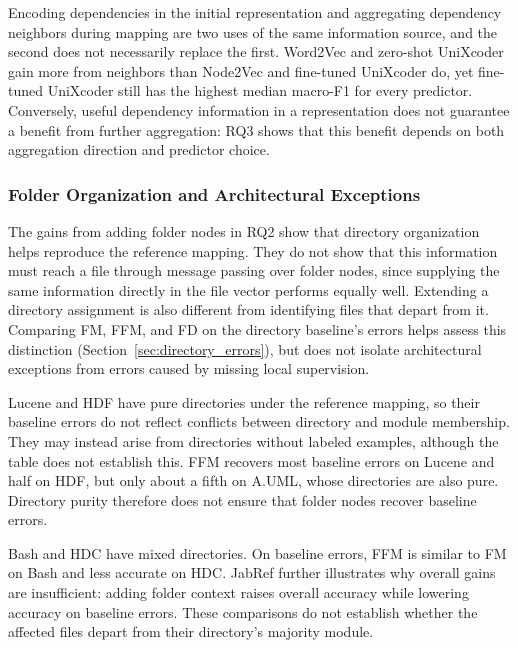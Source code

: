 Encoding dependencies in the initial representation and aggregating dependency neighbors during mapping are two uses of the same information source, and the second does not necessarily replace the first. Word2Vec and zero-shot UniXcoder gain more from neighbors than Node2Vec and fine-tuned UniXcoder do, yet fine-tuned UniXcoder still has the highest median macro-F1 for every predictor. Conversely, useful dependency information in a representation does not guarantee a benefit from further aggregation: RQ3 shows that this benefit depends on both aggregation direction and predictor choice.

\subsubsection*{Folder Organization and Architectural Exceptions}
The gains from adding folder nodes in RQ2 show that directory organization helps reproduce the reference mapping. They do not show that this information must reach a file through message passing over folder nodes, since supplying the same information directly in the file vector performs equally well. Extending a directory assignment is also different from identifying files that depart from it. Comparing FM, FFM, and FD on the directory baseline's errors helps assess this distinction (Section~\ref{sec:directory_errors}), but does not isolate architectural exceptions from errors caused by missing local supervision.
 
Lucene and HDF have pure directories under the reference mapping, so their baseline errors do not reflect conflicts between directory and module membership. They may instead arise from directories without labeled examples, although the table does not establish this. FFM recovers most baseline errors on Lucene and half on HDF, but only about a fifth on A.UML, whose directories are also pure. Directory purity therefore does not ensure that folder nodes recover baseline errors.
 
Bash and HDC have mixed directories. On baseline errors, FFM is similar to FM on Bash and less accurate on HDC. JabRef further illustrates why overall gains are insufficient: adding folder context raises overall accuracy while lowering accuracy on baseline errors. These comparisons do not establish whether the affected files depart from their directory's majority module.
 
